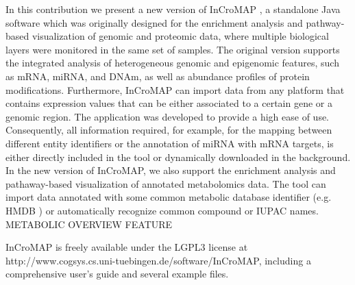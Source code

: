 \documentclass[final,5p,times,twocolumn]{elsarticle}
\begin{document}
In this contribution we present a new version of InCroMAP \cite{Wrzodek2012a,Wrzodek2012b}, a standalone Java software which was originally designed for the enrichment analysis and pathway-based visualization of genomic and proteomic data, where multiple biological layers were monitored in the same set of samples. The original version supports the integrated analysis of heterogeneous genomic and epigenomic features, such as mRNA, miRNA, and DNAm, as well as abundance profiles of protein modifications. Furthermore, InCroMAP can import data from any platform that contains expression values that can be either associated to a certain gene or a genomic region. The application was developed to provide a high ease of use. Consequently, all information required, for example, for the mapping between different entity identifiers or the annotation of miRNA with mRNA targets, is either directly included in the tool or dynamically downloaded in the background. In the new version of InCroMAP, we also support the enrichment analysis and pathaway-based visualization of annotated metabolomics data. The tool can import data annotated with some common metabolic database identifier (e.g. HMDB \cite{Wishart2009}) or automatically recognize common compound or IUPAC names. METABOLIC OVERVIEW FEATURE

InCroMAP is freely available under the LGPL3 license at http://www.cogsys.cs.uni-tuebingen.de/software/InCroMAP, including a comprehensive user’s guide and several example files.
\end{document}

